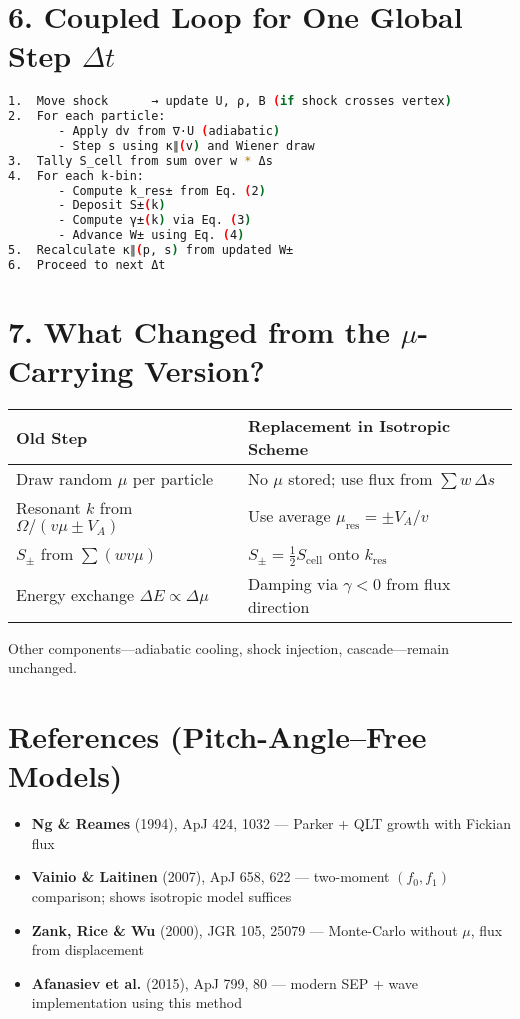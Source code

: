 \section*{6. Coupled Loop for One Global Step $\Delta t$}

\begin{lstlisting}[language=bash,basicstyle=\ttfamily\small]
1.  Move shock      → update U, ρ, B (if shock crosses vertex)
2.  For each particle:
       - Apply dv from ∇·U (adiabatic)
       - Step s using κ∥(v) and Wiener draw
3.  Tally S_cell from sum over w * Δs
4.  For each k-bin:
       - Compute k_res± from Eq. (2)
       - Deposit S±(k)
       - Compute γ±(k) via Eq. (3)
       - Advance W± using Eq. (4)
5.  Recalculate κ∥(p, s) from updated W±
6.  Proceed to next Δt
\end{lstlisting}

\section*{7. What Changed from the $\mu$-Carrying Version?}

\begin{center}
\begin{tabular}{p{6.5cm} p{8cm}}
\toprule
\textbf{Old Step} & \textbf{Replacement in Isotropic Scheme} \\
\midrule
Draw random $\mu$ per particle & No $\mu$ stored; use flux from $\sum w \, \Delta s$ \\
Resonant $k$ from $\Omega/(v\mu \pm V_A)$ & Use average $\mu_{\text{res}} = \pm V_A / v$ \\
$S_\pm$ from $\sum (w v \mu)$ & $S_\pm = \tfrac{1}{2} S_{\text{cell}}$ onto $k_{\text{res}}$ \\
Energy exchange $\Delta E \propto \Delta \mu$ & Damping via $\gamma < 0$ from flux direction \\
\bottomrule
\end{tabular}
\end{center}

Other components—adiabatic cooling, shock injection, cascade—remain unchanged.

\section*{References (Pitch-Angle–Free Models)}

\begin{itemize}
    \item \textbf{Ng \& Reames} (1994), ApJ 424, 1032 — Parker + QLT growth with Fickian flux
    \item \textbf{Vainio \& Laitinen} (2007), ApJ 658, 622 — two-moment $(f_0, f_1)$ comparison; shows isotropic model suffices
    \item \textbf{Zank, Rice \& Wu} (2000), JGR 105, 25079 — Monte-Carlo without $\mu$, flux from displacement
    \item \textbf{Afanasiev et al.} (2015), ApJ 799, 80 — modern SEP + wave implementation using this method
\end{itemize}


